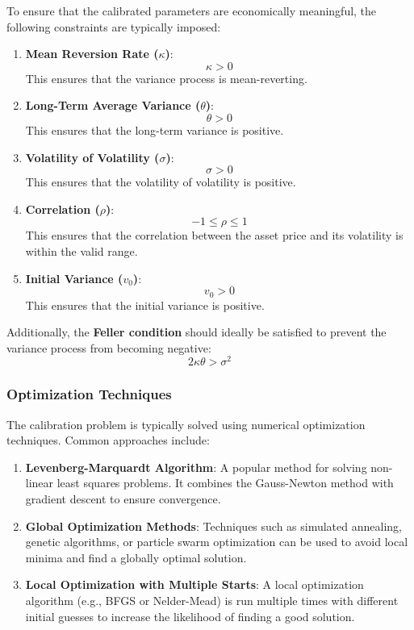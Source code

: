 \documentclass[11pt, oneside, a4paper, titlepage]{report}
\begin{document}
To ensure that the calibrated parameters are economically meaningful, the following constraints are typically imposed:
\begin{enumerate}
    \item \textbf{Mean Reversion Rate (\( \kappa \))}:
    \[
    \kappa > 0
    \]
    This ensures that the variance process is mean-reverting.
    \item \textbf{Long-Term Average Variance (\( \theta \))}:
    \[
    \theta > 0
    \]
    This ensures that the long-term variance is positive.
    \item \textbf{Volatility of Volatility (\( \sigma \))}:
    \[
    \sigma > 0
    \]
    This ensures that the volatility of volatility is positive.
    \item \textbf{Correlation (\( \rho \))}:
    \[
    -1 \leq \rho \leq 1
    \]
    This ensures that the correlation between the asset price and its volatility is within the valid range.
    \item \textbf{Initial Variance (\( v_0 \))}:
    \[
    v_0 > 0
    \]
    This ensures that the initial variance is positive.
\end{enumerate}

Additionally, the \textbf{Feller condition} should ideally be satisfied to prevent the variance process from becoming negative:
\[
2 \kappa \theta > \sigma^2
\]

\subsubsection{Optimization Techniques}

The calibration problem is typically solved using numerical optimization techniques. Common approaches include:
\begin{enumerate}
    \item \textbf{Levenberg-Marquardt Algorithm}:
    A popular method for solving non-linear least squares problems. It combines the Gauss-Newton method with gradient descent to ensure convergence.
    \item \textbf{Global Optimization Methods}:
    Techniques such as simulated annealing, genetic algorithms, or particle swarm optimization can be used to avoid local minima and find a globally optimal solution.
    \item \textbf{Local Optimization with Multiple Starts}:
    A local optimization algorithm (e.g., BFGS or Nelder-Mead) is run multiple times with different initial guesses to increase the likelihood of finding a good solution.
\end{enumerate}
\end{document}
